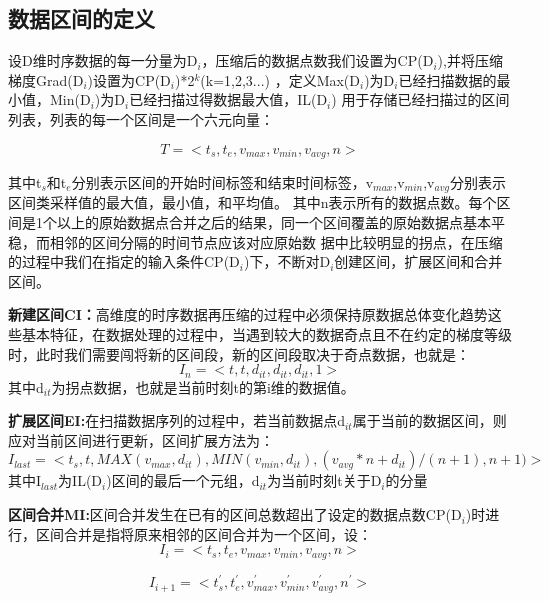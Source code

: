 \subsection{数据区间的定义}
\label{sectoin 3.13}

设D维时序数据的每一分量为D$_{i}$，压缩后的数据点数我们设置为CP(D$_{i}$),并将压缩梯度Grad(D$_{i}$)设置为CP(D$_{i}$)*2$^{k}$(k=1,2,3...)
，定义Max(D$_{i}$)为D$_{i}$已经扫描数据的最小值，Min(D$_{i}$)为D$_{i}$已经扫描过得数据最大值，IL(D$_{i}$)
用于存储已经扫描过的区间列表，列表的每一个区间是一个六元向量：


\begin{equation}
T=<t_{s},t_{e},v_{max},v_{min},v_{avg},n>
\end{equation}


其中t$_{s}$和t$_{e}$分别表示区间的开始时间标签和结束时间标签，v$_{max}$,v$_{min}$,v$_{avg}$分别表示区间类采样值的最大值，最小值，和平均值。
其中n表示所有的数据点数。每个区间是1个以上的原始数据点合并之后的结果，同一个区间覆盖的原始数据点基本平稳，而相邻的区间分隔的时间节点应该对应原始数
据中比较明显的拐点，在压缩的过程中我们在指定的输入条件CP(D$_{i}$)下，不断对D$_{i}$创建区间，扩展区间和合并区间。


\textbf{新建区间CI：}高维度的时序数据再压缩的过程中必须保持原数据总体变化趋势这些基本特征，在数据处理的过程中，当遇到较大的数据奇点且不在约定的梯度等级时，此时我们需要闯将新的区间段，新的区间段取决于奇点数据，也就是：
\begin{equation}
I_{n}=<t,t,d_{it},d_{it},d_{it},1>
\end{equation}
其中d$_{it}$为拐点数据，也就是当前时刻t的第i维的数据值。

\textbf{扩展区间EI:}在扫描数据序列的过程中，若当前数据点d$_{it}$属于当前的数据区间，则应对当前区间进行更新，区间扩展方法为：
\begin{equation}
I_{last}=<t_{s},t,MAX(v_{max},d_{it}),MIN(v_{min},d_{it}),(v_{avg}*n+d_{it})/(n+1),n+1)>
\end{equation}
其中I$_{last}$为IL(D$_{i}$)区间的最后一个元组，d$_{it}$为当前时刻t关于D$_{i}$的分量


\textbf{区间合并MI:}区间合并发生在已有的区间总数超出了设定的数据点数CP(D$_{i}$)时进行，区间合并是指将原来相邻的区间合并为一个区间，设：
\begin{equation}
I_{i}=<t_{s},t_{e},v_{max},v_{min},v_{avg},n>
\end{equation}


\begin{equation}
I_{i+1}=<t_{s}^{'},t_{e}^{'},v_{max}^{'},v_{min}^{'},v_{avg}^{'},n^{'}>
\end{equation}

